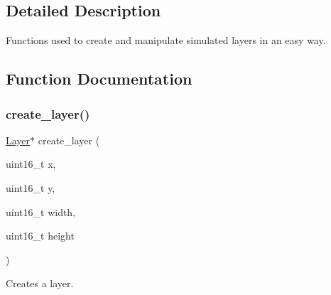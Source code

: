 \subsection{Detailed Description}
Functions used to create and manipulate simulated layers in an easy way. 

\subsection{Function Documentation}
\mbox{\label{group__layer_gae7f68548d31f2961ac68df03e53558c2}} 
\subsubsection{\texorpdfstring{create\+\_\+layer()}{create\_layer()}}
{\footnotesize\ttfamily \mbox{\hyperlink{struct_layer}{Layer}}$\ast$ create\+\_\+layer (\begin{DoxyParamCaption}\item[{uint16\+\_\+t}]{x,  }\item[{uint16\+\_\+t}]{y,  }\item[{uint16\+\_\+t}]{width,  }\item[{uint16\+\_\+t}]{height }\end{DoxyParamCaption})}



Creates a layer. 


